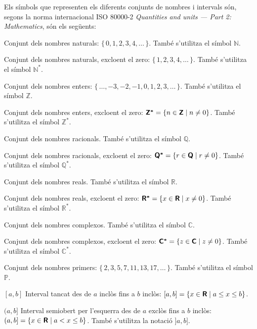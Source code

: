\pagebreak

Els símbols que representen els diferents conjunts de nombres i intervals són, segons la norma internacional ISO 80000-2 \textit{Quantities and units --- Part 2: Mathematics}, són els següents:

\begin{list}{}
{\setlength{\labelwidth}{15mm} \setlength{\leftmargin}{20mm}
\setlength{\labelsep}{5mm}}
    \item[\mathsfb{N}] Conjunt dels nombres naturals: $\{\,0,1,2,3,4,\ldots\,\}$. També s'utilitza el símbol $\mathbb{N}$.
    \item[\mathsfb{N^*}] Conjunt dels nombres naturals, excloent el zero: $\{\,1,2,3,4,\ldots\,\}$. També s'utilitza el símbol $\mathbb{N^*}$.
    \item[\mathsfb{Z}] Conjunt dels nombres enters: $\{\,\ldots,-3,-2,-1,0,1,2,3,\ldots\,\}$.
     També s'utilitza el símbol $\mathbb{Z}$.
    \item[\mathsfb{Z^*}] Conjunt dels nombres enters, excloent el zero: ${\boldsymbol{\mathsf{Z^*}}} = \{ n \in {\ensuremath{\boldsymbol{\mathsf{Z}}}} \mid n \ne 0\}$. També s'utilitza el símbol $\mathbb{Z^*}$.
     \item[\mathsfb{Q}] Conjunt dels nombres racionals. També s'utilitza el símbol $\mathbb{Q}$.
     \item[\mathsfb{Q^*}] Conjunt dels nombres racionals, excloent el zero: ${\boldsymbol{\mathsf{Q^*}}} = \{ r \in {\ensuremath{\boldsymbol{\mathsf{Q}}}} \mid r \ne 0\}$. També s'utilitza el símbol $\mathbb{Q^*}$.
     \item[\mathsfb{R}] Conjunt dels nombres reals. També s'utilitza el símbol $\mathbb{R}$.
	 \item[\mathsfb{R^*}] Conjunt dels nombres reals, excloent el zero: ${\boldsymbol{\mathsf{R^*}}} = \{ x \in {\ensuremath{\boldsymbol{\mathsf{R}}}} \mid x \ne 0\}$. També s'utilitza el símbol $\mathbb{R^*}$.
     \item[\mathsfb{C}] Conjunt dels nombres complexos. També s'utilitza el símbol $\mathbb{C}$.
     \item[\mathsfb{C^*}] Conjunt dels nombres complexos, excloent el zero: ${\boldsymbol{\mathsf{C^*}}} = \{ z \in {\ensuremath{\boldsymbol{\mathsf{C}}}} \mid z \ne 0\}$. També s'utilitza el símbol $\mathbb{C^*}$.
     \item[\mathsfb{P}] Conjunt dels nombres primers: $\{\,2,3,5,7,11,13,17,\ldots\,\}$. També s'utilitza el símbol $\mathbb{P}$.
     \item[{$[a,b]$}] Interval tancat des de $a$ inclòs fins a $b$ inclòs: $[a,b] = \{x \in {\ensuremath{\boldsymbol{\mathsf{R}}}} \mid a \leq x \leq b\}$.
     \item[{$(a,b]$}] Interval semiobert per l'esquerra des de $a$ exclòs fins a $b$ inclòs: $(a,b] = \{x \in {\ensuremath{\boldsymbol{\mathsf{R}}}} \mid a < x \leq b\}$. També s'utilitza la notació $]a,b]$.

\end{list}

